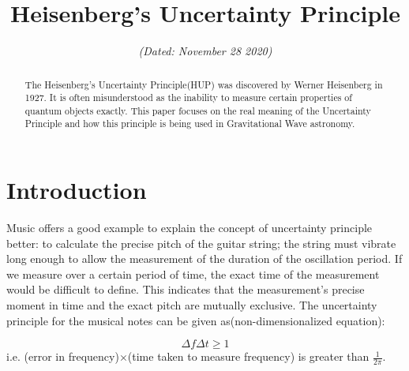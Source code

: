\documentclass[conference]{IEEEtran}
\begin{document}
\title{Heisenberg's Uncertainty Principle\\
}

\author{
\textit{(Dated: November 28 2020)}
}

\maketitle
\thispagestyle{plain}
\begin{abstract}

The Heisenberg’s Uncertainty Principle(HUP) was discovered by Werner Heisenberg in 1927. It is often misunderstood as the inability to measure certain properties of quantum objects exactly. This paper focuses on the real meaning of the Uncertainty Principle and how this principle is being used in Gravitational Wave astronomy.

\end{abstract}


\section{Introduction}
Music offers a good  example to explain the concept of uncertainty principle better: to calculate the precise pitch of the guitar string; the string must vibrate long enough to allow the measurement of the duration of the oscillation period. If we measure over a certain period of time, the exact time of the measurement would be difficult to define. This indicates that the measurement's precise moment in time and the exact pitch are mutually exclusive. The uncertainty principle for the musical notes can be given as(non-dimensionalized equation):

\begin{equation}
\Delta f \Delta t \geq {1} 
\end{equation}
i.e. (error in frequency)$\times$(time taken to measure frequency) is greater than $\frac{1}{2\pi}$\cite{Heisenbergs,Musicians}.
\end{document}
